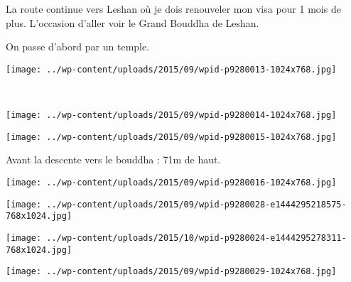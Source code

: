  La route continue vers Leshan où je dois renouveler mon visa pour 1 mois de plus. L'occasion d'aller voir le Grand Bouddha de Leshan. 

 On passe d'abord par un temple. 
\begin{center} \texttt{[image: ../wp-content/uploads/2015/09/wpid-p9280013-1024x768.jpg]} \end{center}
\vspace{-\topsep}
\pagebreak
~
\vspace{0.75mm}
\begin{center} \texttt{[image: ../wp-content/uploads/2015/09/wpid-p9280014-1024x768.jpg]} \end{center}
\vfill
\begin{center} \texttt{[image: ../wp-content/uploads/2015/09/wpid-p9280015-1024x768.jpg]} \end{center}
\vspace{-\topsep}
\vspace{-0.75mm}
\pagebreak
 
 Avant la descente vers le bouddha : 71m de haut. 
\begin{center} \texttt{[image: ../wp-content/uploads/2015/09/wpid-p9280016-1024x768.jpg]} \end{center}
\begin{center} \texttt{[image: ../wp-content/uploads/2015/09/wpid-p9280028-e1444295218575-768x1024.jpg]} \end{center} 
\begin{center} \texttt{[image: ../wp-content/uploads/2015/10/wpid-p9280024-e1444295278311-768x1024.jpg]} \end{center}
\vfill
\begin{center} \texttt{[image: ../wp-content/uploads/2015/09/wpid-p9280029-1024x768.jpg]} \end{center}
\vspace{-\topsep}
\vspace{-0.75mm}
